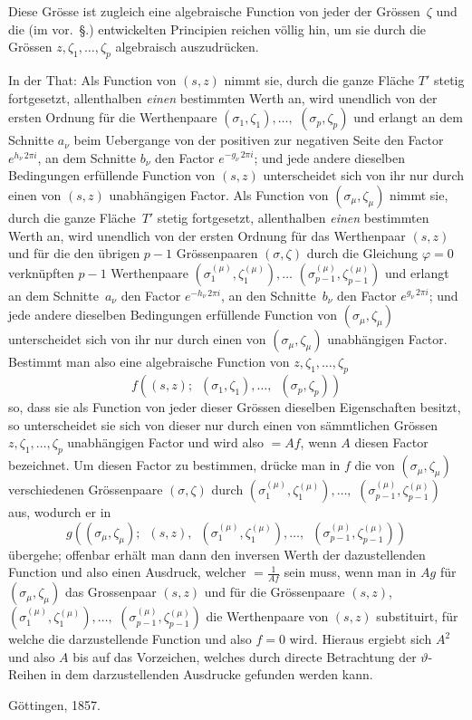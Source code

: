 \documentclass[a4paper,12pt,leqno]{article}
\begin{document}
Diese Gr\"{o}sse ist zugleich eine algebraische Function von
jeder der Gr\"{o}ssen~$\zeta$ und die (im vor.~\S.) entwickelten
Principien reichen v\"{o}llig hin, um sie durch die Gr\"{o}ssen
$z, \zeta_1,\ldots, \zeta_p$ algebraisch auszudr\"{u}cken.

In der That: Als Function von $(s,z)$ nimmt sie, durch die ganze
Fl\"{a}che $T'$ stetig fortgesetzt, allenthalben \emph{einen}
bestimmten  Werth an, wird unendlich von der ersten Ordnung
f\"{u}r die Werthenpaare
$(\sigma_1, \zeta_1),\ldots,$ $(\sigma_p, \zeta_p)$
und erlangt an dem Schnitte $a_\nu$ beim Uebergange von der
positiven zur negativen Seite den Factor $e^{h_\nu \, 2 \pi i}$,
an dem Schnitte $b_\nu$ den Factor $e^{- g_\nu \, 2 \pi i}$; und
jede andere dieselben Bedingungen erf\"{u}llende Function von
$(s,z)$ unterscheidet sich von ihr nur durch einen von $(s,z)$
unabh\"{a}ngigen Factor.  Als Function von
$(\sigma_\mu, \zeta_\mu)$ nimmt sie, durch die ganze
Fl\"{a}che~$T'$ stetig fortgesetzt, allenthalben \emph{einen}
bestimmten Werth an, wird unendlich von der ersten Ordnung
f\"{u}r das Werth\-enpaar $(s,z)$ und f\"{u}r die den \"{u}brigen
$p - 1$ Gr\"{o}ssenpaaren $(\sigma, \zeta)$ durch die Gleichung
$\varphi = 0$ verkn\"{u}pften $p - 1$ Werthenpaare
$(\sigma_1^{(\mu)}, \zeta_1^{(\mu)}),\ldots$
$(\sigma_{p-1}^{(\mu)}, \zeta_{p-1}^{(\mu)})$
und erlangt an dem Schnitte~$a_\nu$ den Factor
$e^{- h_\nu \, 2 \pi i}$, an den Schnitte~$b_\nu$ den Factor
$e^{g_\nu \, 2 \pi i}$; und jede andere dieselben Bedingungen
erf\"{u}llende Function von $(\sigma_\mu, \zeta_\mu)$
unterscheidet sich von ihr nur durch einen von
$(\sigma_\mu, \zeta_\mu)$ unabh\"{a}ngigen Factor.  Bestimmt man
also eine algebraische Function von
$z, \zeta_1,\ldots, \zeta_p$
\[ f( (s,z);\enspace
      (\sigma_1, \zeta_1),\ldots,\enspace
      (\sigma_p, \zeta_p) ) \]
so, dass sie als Function von jeder dieser Gr\"{o}ssen dieselben
Eigenschaften besitzt, so unterscheidet sie sich von dieser nur
durch einen von s\"{a}mmtlichen Gr\"{o}ssen
$z, \zeta_1,\ldots, \zeta_p$
unabh\"{a}ngigen Factor und wird also $= Af$, wenn $A$ diesen
Factor bezeichnet.  Um diesen Factor zu bestimmen, dr\"{u}cke man
in $f$ die von $(\sigma_\mu, \zeta_\mu)$ verschiedenen
Gr\"{o}ssenpaare $(\sigma, \zeta)$ durch
$(\sigma_1^{(\mu)}, \zeta_1^{(\mu)}),\ldots,$
$(\sigma_{p-1}^{(\mu)}, \zeta_{p-1}^{(\mu)})$
aus, wodurch er in
\[ g( (\sigma_\mu, \zeta_\mu);\enspace
      (s,z),\enspace
      (\sigma_1^{(\mu)}, \zeta_1^{(\mu)}),\ldots,\enspace
      (\sigma_{p-1}^{(\mu)}, \zeta_{p-1}^{(\mu)}) ) \]
\"{u}bergehe; offenbar erh\"{a}lt man dann den inversen Werth der
dazustellenden Function und also einen Ausdruck, welcher
$\displaystyle= \frac{1}{Af}$
sein muss, wenn man in $Ag$ f\"{u}r $(\sigma_\mu, \zeta_\mu)$ das
Grossenpaar $(s,z)$ und f\"{u}r die Gr\"{o}ssenpaare
$(s,z)$, $(\sigma_1^{(\mu)}, \zeta_1^{(\mu)}),\ldots,$
$(\sigma_{p-1}^{(\mu)}, \zeta_{p-1}^{(\mu)})$
die Werthenpaare von $(s,z)$ substituirt, f\"{u}r welche die
darzustellende Function und also $f = 0$ wird.  Hieraus ergiebt
sich $A^2$ und also $A$ bis auf das Vorzeichen, welches durch
directe Betrachtung der $\vartheta$-Reihen in dem darzustellenden
Ausdrucke gefunden werden kann.

G\"{o}ttingen, 1857.
\end{document}
